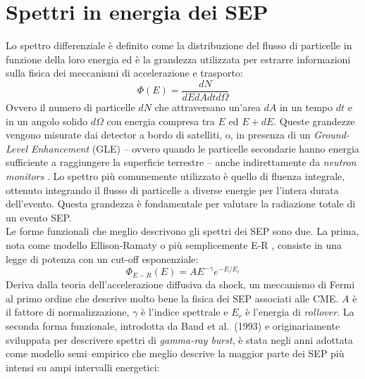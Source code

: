 \documentclass[12pt]{report}
\begin{document}
\section{Spettri in energia dei SEP}
\enlargethispage{1.25\baselineskip}
Lo spettro differenziale è definito come la distribuzione del flusso di particelle in funzione della loro energia ed è la grandezza utilizzata per estrarre informazioni sulla fisica dei meccanismi di accelerazione e trasporto:
\begin{equation}
    \Phi(E) = \frac{dN}{dEdAdtd\Omega}
\end{equation}
Ovvero il numero di particelle $dN$ che attraversano un'area $dA$ in un tempo $dt$ e in un angolo solido $d\Omega$ con energia compresa tra $E$ ed $E+dE$.
Queste grandezze vengono misurate dai detector a bordo di satelliti, o, in presenza di un \textit{Ground-Level Enhancement} (GLE) -- ovvero quando le particelle secondarie hanno energia sufficiente a raggiungere la superficie terrestre -- anche indirettamente da \textit{neutron monitors} \cite{NeuntronMonitors2020}. Lo spettro più comunemente utilizzato è quello di fluenza integrale, ottenuto integrando il flusso di particelle a diverse energie per l'intera durata dell'evento. Questa grandezza è fondamentale per valutare la radiazione totale di un evento SEP.\\
Le forme funzionali che meglio descrivono gli spettri dei SEP sono due. La prima, nota come modello Ellison-Ramaty o più semplicemente E-R \cite{Ellison-Ramaty}, consiste in una legge di potenza con un cut-off esponenziale:
\begin{equation}
    \Phi_{E-R}(E) = A E^{-\gamma} e^{-E/E_r}
\end{equation}
Deriva dalla teoria dell'accelerazione diffusiva da shock, un meccanismo di Fermi al primo ordine che descrive molto bene la fisica dei SEP associati alle CME. $A$ è il fattore di normalizzazione, $\gamma$ è l'indice spettrale e $E_r$ è l'energia di \textit{rollover}.
La seconda forma funzionale, introdotta da Band et al.\ (1993) \cite{Band1993} e originariamente sviluppata per descrivere spettri di \textit{gamma-ray burst}, è stata negli anni adottata come modello semi--empirico che meglio descrive la maggior parte dei SEP più intensi \cite{Mewaldt2005} su ampi intervalli energetici: 
\end{document}

